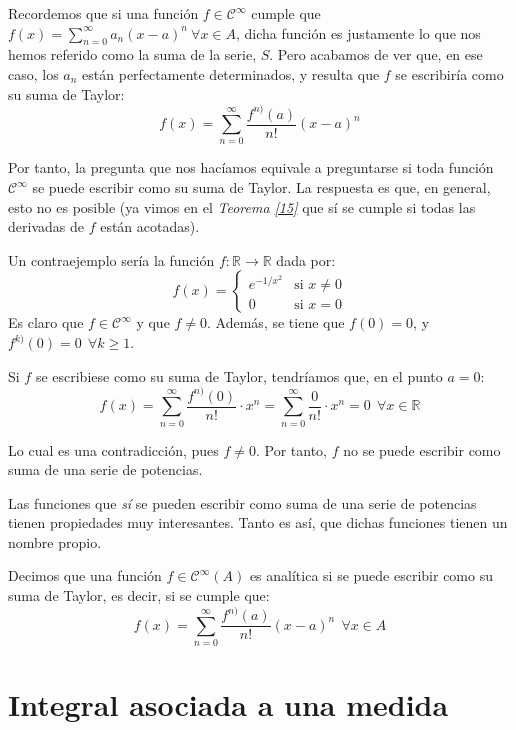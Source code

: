 Recordemos que si una función $f \in \mathcal{C}^{\infty}$ cumple que $f(x) = \sum_{n=0}^{\infty} a_n(x-a)^n\ \forall x \in A$, dicha función es justamente lo que nos hemos referido como la suma de la serie, $S$. Pero acabamos de ver que, en ese caso, los $a_n$ están perfectamente determinados, y resulta que $f$ se escribiría como su suma de Taylor: $$f(x) = \sum_{n=0}^{\infty} \frac{f^{n)}(a)}{n!} (x-a)^n$$

Por tanto, la pregunta que nos hacíamos equivale a preguntarse si toda función $\mathcal{C}^{\infty}$ se puede escribir como su suma de Taylor. La respuesta es que, en general, esto no es posible (ya vimos en el \textit{Teorema \ref{15}} que sí se cumple si todas las derivadas de $f$ están acotadas).

Un contraejemplo sería la función $f: \mathbb{R} \longrightarrow \mathbb{R}$ dada por: $$f(x) = \begin{cases}
  e^{-1/x^2} & \text{si } x\ne 0\\
  0 & \text{si } x=0
\end{cases}$$ Es claro que $f \in \mathcal{C}^{\infty}$ y que $f \ne 0$. Además, se tiene que $f(0) = 0$, y $f^{k)}(0) = 0\ \ \forall k \ge 1$.

Si $f$ se escribiese como su suma de Taylor, tendríamos que, en el punto $a=0$: $$f(x) = \sum_{n=0}^{\infty} \frac{f^{n)}(0)}{n!} \cdot x^n =  \sum_{n=0}^{\infty} \frac{0}{n!}\cdot x^n = 0\ \ \forall x \in \mathbb{R}$$

Lo cual es una contradicción, pues $f\ne 0$. Por tanto, $f$ no se puede escribir como suma de una serie de potencias.

Las funciones que \textit{sí} se pueden escribir como suma de una serie de potencias tienen propiedades muy interesantes. Tanto es así, que dichas funciones tienen un nombre propio.

\begin{ndef} Decimos que una función $f \in \mathcal{C}^{\infty}(A)$ es analítica si se puede escribir como su suma de Taylor, es decir, si se cumple que: $$f(x) = \sum_{n=0}^{\infty} \frac{f^{n)}(a)}{n!}(x-a)^n\ \ \forall x \in A$$
\end{ndef}

\newpage



\section{Integral asociada a una medida}

